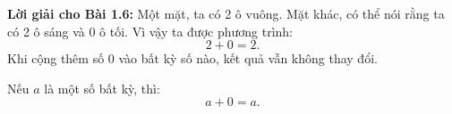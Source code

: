 \documentclass[12pt,a4paper]{book}
\begin{document}
\noindent\textbf{Lời giải cho Bài 1.6:}  
Một mặt, ta có 2 ô vuông.  
Mặt khác, có thể nói rằng ta có 2 ô sáng và 0 ô tối.  
Vì vậy ta được phương trình:
\[
2 + 0 = 2.
\]
Khi cộng thêm số 0 vào bất kỳ số nào, kết quả vẫn không thay đổi.

\begin{tcolorbox}[colback=yellow!10!white, colframe=orange!80!black,
title={Tính chất cộng với số không}]
Nếu \(a\) là một số bất kỳ, thì:
\[
a + 0 = a.
\]
\end{tcolorbox}
\end{document}

